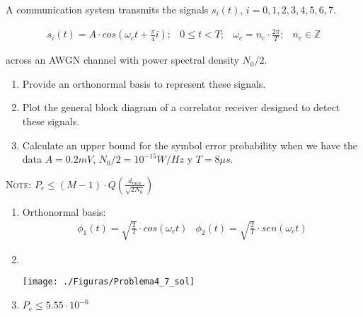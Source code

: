 \documentclass[idioma,boletin]{uah}
\begin{document}
{

A communication system transmits the signals $s_i(t)$, $i = 0,1,2,3,4,5,6,7$.

\begin{displaymath}
	\begin{array}{llll}
		s_i(t) = A \cdot cos \left ( \omega_c t + \frac{\pi}{4}i \right ) ; & 0 \leq t < T ; & \omega_c = n_c \cdot \frac{2\pi}{T} ; & n_c \in \mathbb{Z}
	\end{array}
\end{displaymath}

across an AWGN channel with power spectral density $N_0/2$.

\begin{enumerate}
	\item Provide an orthonormal basis to represent these signals.
	\item Plot the general block diagram of a correlator receiver designed to detect these signals.
	\item Calculate an upper bound for the symbol error probability when we have the data $A = 0.2 mV$, $N_0/2 = 10^{-15}  W/Hz$ y $T = 8 \mu s$.
\end{enumerate}

\textsc{Note:} $P_e \leq (M-1) \cdot Q\left (\frac{d_{min}}{\sqrt{2N_0}} \right )$
}
{

\begin{enumerate}
	\item Orthonormal basis:
		\begin{displaymath}
			\begin{array}{ll}
				\phi_1(t) = \sqrt{\frac{2}{T}} \cdot cos(\omega_c t) & \phi_2(t) = \sqrt{\frac{2}{T}} \cdot sen(\omega_c t)
			\end{array}
		\end{displaymath}
	\item \
		\begin{figure*}[h!]
			\centering\texttt{[image: ./Figuras/Problema4\_7\_sol]}
		\end{figure*}
	\item $P_e \leq 5.55 \cdot 10^{-6}$
\end{enumerate}
}

\newpage
\end{document}
